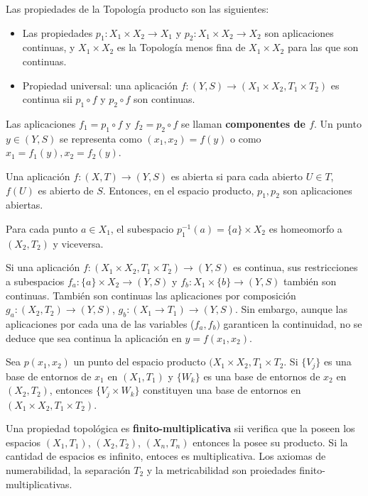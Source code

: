 \documentclass[a4paper, 11pt]{extarticle}
\begin{document}
Las propiedades de la Topología producto son las siguientes:
\begin{itemize}
\item Las propiedades \(p_1: X_1 \times X_2 \rightarrow X_1\) y \(p_2:X_1 \times
  X_2 \rightarrow X_2\) son aplicaciones continuas, y \(X_1 \times X_2\) es
la Topología menos fina de \(X_1 \times X_2\) para las que son continuas.
\item Propiedad universal: una aplicación \(f: (Y,S) \rightarrow (X_1 \times X_2,
  T_1 \times T_2)\) es continua sii \(p_1 \circ f\) y \(p_2 \circ f\) son
continuas.
\end{itemize}
Las aplicaciones \(f_1 = p_1 \circ f\) y \(f_2 = p_2 \circ f\) se llaman
\textbf{componentes de \(f\)}. Un punto \(y \in (Y,S)\) se representa como \((x_1,x_2) = f(y)\) o como \(x_1 = f_1(y), x_2 = f_2(y)\).

Una aplicación \(f: (X,T) \rightarrow  (Y,S)\) es abierta si para cada abierto
\(U \in T\), \(f(U)\) es abierto de \(S\). Entonces, en el espacio
producto, \(p_1, p_2\) son aplicaciones abiertas.

Para cada punto \(a \in X_1\), el subespacio \(p_1 ^{-1}(a) = \{ a \} \times
X_2\) es homeomorfo a \((X_2, T_2)\) y viceversa.

Si una aplicación \(f:(X_1 \times X_2, T_1 \times T_2) \rightarrow (Y,S)\) es
continua, sus restricciones a subespacios \(f_a: \{ a \} \times  X_2
\rightarrow (Y, S)\) y \(f_b: X_1 \times \{ b \} \rightarrow (Y,S)\) también
son continuas. También son continuas las aplicaciones por composición \(g_a:
(X_2, T_2) \rightarrow (Y,S)\), \(g_b: (X_1 \rightarrow T_1) \rightarrow (Y,S)\). Sin embargo, aunque las aplicaciones por cada una de las variables (\(f_a,
f_b)\)  garanticen
la continuidad, no se deduce que sea continua la aplicación en \(y = f(x_1,x_2)\). 

Sea \(p(x_1, x_2)\) un punto del espacio producto \((X_1 \times X_2, T_1
\times T_2\). Si \(\{ V_j \}\) es una base de entornos de \(x_1\) en \((X_1, T_1)\) y \(\{ W_k \}\) es una base de entornos de \(x_2\) en \((X_2,
T_2)\), entonces \(\{ V_j \times W_k \}\) constituyen una base de entornos en
\((X_1 \times X_2, T_1 \times T_2)\).

Una propiedad topológica es \textbf{finito-multiplicativa} sii verifica que la poseen los
espacios \((X_1, T_1)\), \((X_2, T_2)\), \((X_n, T_n)\) entonces la posee
su producto. Si la cantidad de espacios es infinito, entoces es multiplicativa.
Los axiomas de numerabilidad, la separación \(T_2\) y la metricabilidad son
proiedades finito-multiplicativas.
\end{document}
